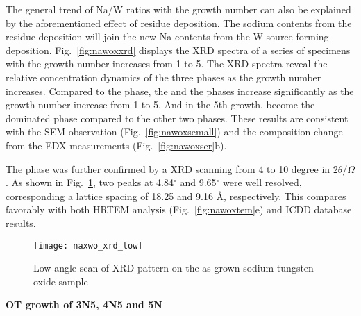 The general trend of Na/W ratios with the growth number can also be explained by the aforementioned effect of residue deposition. The sodium contents from the residue deposition will join the new Na contents from the W source forming deposition. Fig.~\ref{fig:nawoxxrd} displays the XRD spectra of a series of specimens with the growth number increases from 1 to 5. The XRD spectra reveal the relative concentration dynamics of the three phases as the growth number increases. Compared to the  phase, the  and the  phases increase significantly as the growth number increase from 1 to 5. And in the 5th growth,  become the dominated phase compared to the other two phases. These results are consistent with the SEM observation (Fig.~\ref{fig:nawoxsemall}) and the composition change from the EDX measurements (Fig.~\ref{fig:nawoxser}b).

The  phase was further confirmed by a XRD scanning from 4 to 10 degree in $2\theta/\Omega$. As shown in Fig.~\ref{fig:naxrdlow}, two peaks at 4.84$^{\circ}$ and 9.65$^{\circ}$ were well resolved, corresponding a lattice spacing of 18.25 and 9.16 \AA, respectively. This compares favorably with both HRTEM analysis (Fig.~\ref{fig:nawoxtem}e) and ICDD database results. 

\begin{figure}[htb]
\centering
\texttt{[image: naxwo\_xrd\_low]}
\caption[low angle scan of XRD pattern]{Low angle scan of XRD pattern on the as-grown sodium tungsten oxide sample}
\label{fig:naxrdlow}
\end{figure}


\textbf{OT growth of 3N5, 4N5 and 5N}

